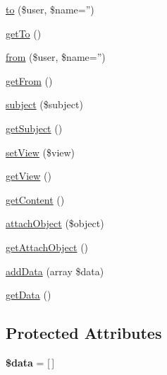 \begin{DoxyCompactItemize}
\item 
\hyperlink{classDMA_1_1Friends_1_1Classes_1_1Notifications_1_1NotificationMessage_aa06665480e18b8c67f44d540d40de056}{to} (\$user, \$name='')
\item 
\hyperlink{classDMA_1_1Friends_1_1Classes_1_1Notifications_1_1NotificationMessage_a4624b8e70bbf7a7bb78f1fe3f66e1000}{get\-To} ()
\item 
\hyperlink{classDMA_1_1Friends_1_1Classes_1_1Notifications_1_1NotificationMessage_ae41e62a261b29dd2263cc44ec4f07a06}{from} (\$user, \$name='')
\item 
\hyperlink{classDMA_1_1Friends_1_1Classes_1_1Notifications_1_1NotificationMessage_ab25f664635774de1c070fc64f31e11db}{get\-From} ()
\item 
\hyperlink{classDMA_1_1Friends_1_1Classes_1_1Notifications_1_1NotificationMessage_a56bd484fb63c383f55abc7a6b3cd569c}{subject} (\$subject)
\item 
\hyperlink{classDMA_1_1Friends_1_1Classes_1_1Notifications_1_1NotificationMessage_ab654c9e552ea3bcb7603c1b415163834}{get\-Subject} ()
\item 
\hyperlink{classDMA_1_1Friends_1_1Classes_1_1Notifications_1_1NotificationMessage_a1ebaa3a47663e91b9ea9eca7cc2b4b6b}{set\-View} (\$view)
\item 
\hyperlink{classDMA_1_1Friends_1_1Classes_1_1Notifications_1_1NotificationMessage_a8269a0bcd82e25101aa41e11b380005f}{get\-View} ()
\item 
\hyperlink{classDMA_1_1Friends_1_1Classes_1_1Notifications_1_1NotificationMessage_a4e5099271352936d95e261e7a799aba7}{get\-Content} ()
\item 
\hyperlink{classDMA_1_1Friends_1_1Classes_1_1Notifications_1_1NotificationMessage_ae4e128ad7a5e92489aa72c162ae48ee6}{attach\-Object} (\$object)
\item 
\hyperlink{classDMA_1_1Friends_1_1Classes_1_1Notifications_1_1NotificationMessage_a1db5f00dcc6d8a616da8a3b7455dffd6}{get\-Attach\-Object} ()
\item 
\hyperlink{classDMA_1_1Friends_1_1Classes_1_1Notifications_1_1NotificationMessage_a0ae6a64348a2d1d83cb8f8500f350b6a}{add\-Data} (array \$data)
\item 
\hyperlink{classDMA_1_1Friends_1_1Classes_1_1Notifications_1_1NotificationMessage_a88fd7fe66421a83715d711d7d9871e36}{get\-Data} ()
\end{DoxyCompactItemize}
\subsection*{Protected Attributes}
\begin{DoxyCompactItemize}
\item 
\hypertarget{classDMA_1_1Friends_1_1Classes_1_1Notifications_1_1NotificationMessage_ad2359e3a12a45d8eef6439efae50f245}{{\bfseries \$data} = \mbox{[}$\,$\mbox{]}}\label{classDMA_1_1Friends_1_1Classes_1_1Notifications_1_1NotificationMessage_ad2359e3a12a45d8eef6439efae50f245}

\end{DoxyCompactItemize}


